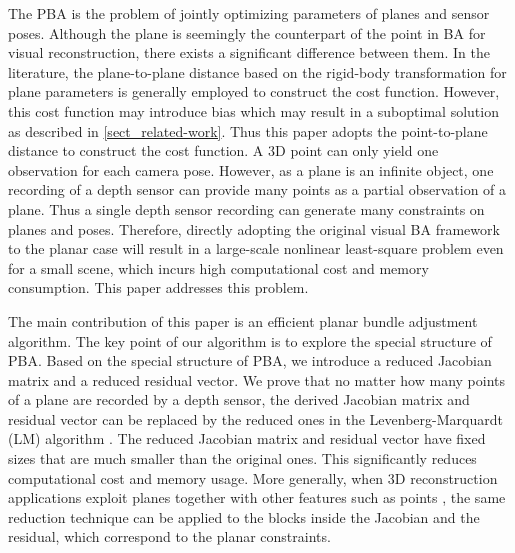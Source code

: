 \documentclass{vgtc}                          %
\begin{document}
The PBA is the problem of jointly optimizing parameters of planes and sensor poses. Although the plane is seemingly the counterpart of the point in BA for visual reconstruction, there exists a significant difference between them. In the literature, the plane-to-plane distance based on  the rigid-body transformation for plane parameters is generally employed to construct the cost function. However, this cost function may introduce bias which may result in  a suboptimal solution as described in \autoref{sect_related-work}. Thus this  paper adopts the point-to-plane distance   to construct the cost function.   A 3D point can only yield one observation for each camera pose. However, as a plane is an infinite object, one recording of a depth sensor can provide many points as a partial observation of a plane. Thus a single depth sensor  recording can generate many constraints on planes and poses. Therefore, directly adopting the original visual BA framework to the planar case will result in a large-scale nonlinear least-square  problem even for a small scene, which incurs high computational cost and memory consumption. This paper addresses this problem.

The main contribution of this paper is an efficient planar bundle adjustment algorithm.
The key point of our algorithm is to explore the  special structure of PBA. Based on the special structure of PBA, we introduce a reduced Jacobian matrix and a reduced residual vector. We prove that no matter how many points of a plane are recorded by a depth sensor, the derived Jacobian matrix and residual vector can  be replaced by the reduced  ones  in the Levenberg-Marquardt (LM) algorithm \cite{levenberg1944method,more1978levenberg}. The reduced Jacobian matrix and  residual vector have  fixed sizes that are  much smaller  than the original ones. This significantly  reduces computational cost and  memory usage. More generally, when 3D reconstruction applications exploit planes together with other features such as points \cite{taguchi2013point,hosseinzadeh2018structure,wang2019submap,grant2019efficient,yang2019tightly}, the same reduction technique can be applied to the blocks inside the  Jacobian and the residual, which correspond to the planar constraints.%
\end{document}
